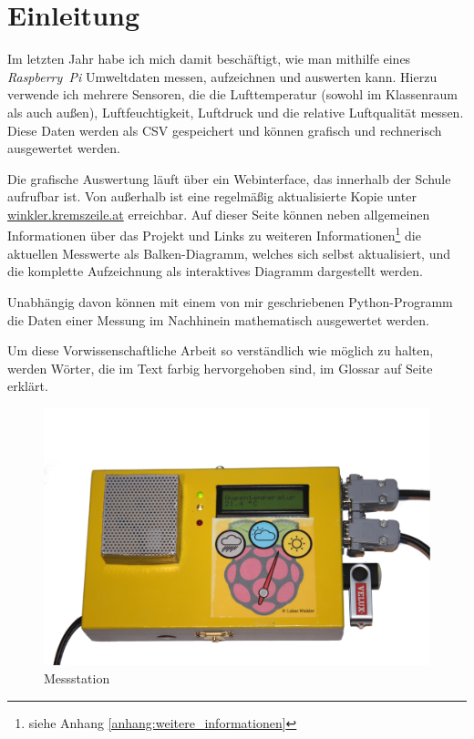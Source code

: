 \chapter{Einleitung}
Im letzten Jahr habe ich mich damit beschäftigt, wie man mithilfe eines \emph{Rasp\-berry~Pi} Umweltdaten messen, aufzeichnen und auswerten kann. Hierzu verwende ich mehrere Sensoren, die die Lufttemperatur (sowohl im Klassenraum als auch außen), Luftfeuchtigkeit, Luftdruck und die relative Luftqualität messen. Diese Daten werden als \gls{CSV} gespeichert und können grafisch und rechnerisch ausgewertet werden. 

Die grafische Auswertung läuft über ein Webinterface, das innerhalb der Schule aufrufbar ist. Von außerhalb ist eine regelmäßig aktualisierte Kopie unter \href{http://winkler.kremszeile.at/}{winkler.kremszeile.at} erreichbar. Auf dieser Seite können neben allgemeinen Informationen über das Projekt und Links zu weiteren Informationen\footnote{siehe Anhang \ref{anhang:weitere_informationen}} die aktuellen Messwerte als Balken-Diagramm, welches sich selbst aktualisiert, und die komplette Aufzeichnung als interaktives Diagramm dargestellt werden.

Unabhängig davon können mit einem von mir geschriebenen \gls{Python}-Programm die Daten einer Messung im Nachhinein mathematisch ausgewertet werden.

Um diese Vorwissenschaftliche Arbeit so verständlich wie möglich zu halten, werden Wörter, die im Text farbig hervorgehoben sind, im Glossar auf Seite \pageref{main} erklärt.

\begin{figure}[h]
  \centering
     \includegraphics[width=\textwidth]{figures/gesamt.png}
  \caption{Messstation}
  \label{fig:gesamt}
\end{figure}